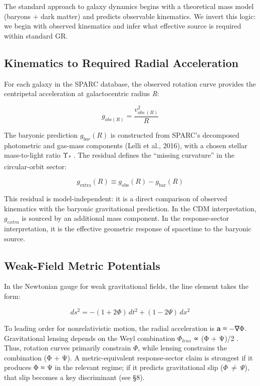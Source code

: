 \documentclass[11pt]{article}
\begin{document}
The standard approach to galaxy dynamics begins with a theoretical mass model (baryons + dark matter) and predicts observable kinematics. We invert this logic: we begin with observed kinematics and infer what effective source is required within standard GR.

\subsection{Kinematics to Required Radial Acceleration}\label{kinematics-to-required-radial-acceleration}

For each galaxy in the SPARC database, the observed rotation curve provides the centripetal acceleration at galactocentric radius \emph{R}:

\[g_{obs(R)} = \frac{v_{obs\ (R)}^{2}}{R}\]

The baryonic prediction \(g_{bar}(R)\) is constructed from SPARC's decomposed photometric and gas-mass components (Lelli et al., 2016), with a chosen stellar mass-to-light ratio Υ\textsubscript{*} \citep{McGaughSchombert2014ML, RubinFord1970M31, Bosma1978Thesis}. The residual defines the ``missing curvature'' in the circular-orbit sector:

\[g_{\text{extra}}(R) \equiv g_{\text{obs}}(R) - g_{\text{bar}}(R)\]

This residual is model-independent: it is a direct comparison of observed kinematics with the baryonic gravitational prediction. In the CDM interpretation, \(g_{extra}\) is sourced by an additional mass component. In the response-sector interpretation, it is the effective geometric response of spacetime to the baryonic source.

\subsection{Weak-Field Metric Potentials}\label{weak-field-metric-potentials}

In the Newtonian gauge for weak gravitational fields, the line element takes the form:

\[ds^{2} = - (1 + 2\Phi)\, dt^{2} + (1 - 2\Psi)\, dx^{2}\]

To leading order for nonrelativistic motion, the radial acceleration is \textbf{a} ≈ −∇Φ. Gravitational lensing depends on the Weyl combination \(\Phi_{lens}\) ∝ (Φ + Ψ)/2 \citep{PoissonWill2014}. Thus, rotation curves primarily constrain \(\Phi\), while lensing constrains the combination (Φ + Ψ). A metric-equivalent response-sector claim is strongest if it produces Φ ≈ Ψ in the relevant regime; if it predicts gravitational slip (\(\Phi\  \neq \ \Psi\)), that slip becomes a key discriminant (see §8).
\end{document}
